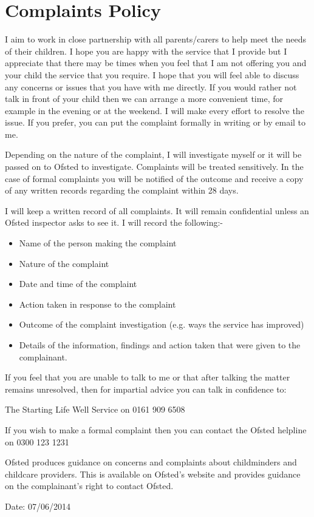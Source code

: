 \documentclass[10pt]{article}
\begin{document}
\section{Complaints Policy}

I aim to work in close partnership with all parents/carers to help meet
the needs of their children. I hope you are happy with the service that
I provide but I appreciate that there may be times when you feel that I
am not offering you and your child the service that you require. I hope
that you will feel able to discuss any concerns or issues that you have
with me directly. If you would rather not talk in front of your child
then we can arrange a more convenient time, for example in the evening
or at the weekend. I will make every effort to resolve the issue. If you
prefer, you can put the complaint formally in writing or by email to me.

Depending on the nature of the complaint, I will investigate myself or
it will be passed on to Ofsted to investigate. Complaints will be
treated sensitively. In the case of formal complaints you will be
notified of the outcome and receive a copy of any written records
regarding the complaint within 28 days.

I will keep a written record of all complaints. It will remain
confidential unless an Ofsted inspector asks to see it. I will record
the following:-

\begin{itemize}
\item
  Name of the person making the complaint~
\item
  Nature of the complaint~
\item
  Date and time of the complaint~
\item
  Action taken in response to the complaint~
\item
  Outcome of the complaint investigation (e.g. ways the service has
  improved)~
\item
  Details of the information, findings and action taken that were given
  to the complainant. ~
\end{itemize}

If you feel that you are unable to talk to me or that after talking the
matter remains unresolved, then for impartial advice you can talk in
confidence to:

The Starting Life Well Service on 0161 909 6508

If you wish to make a formal complaint then you can contact the Ofsted
helpline on 0300 123 1231

Ofsted produces guidance on concerns and complaints about childminders
and childcare providers. This is available on Ofsted's website and
provides guidance on the complainant's right to contact Ofsted.

Date: 07/06/2014

~
\end{document}
